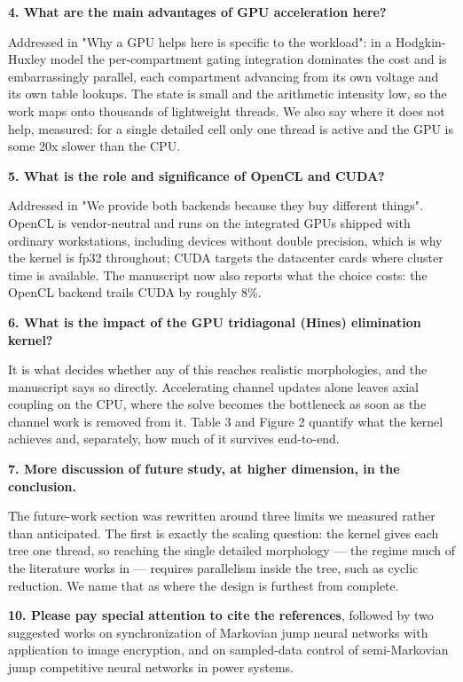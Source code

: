 \documentclass[11pt,a4paper]{article}
\begin{document}
\textbf{4. What are the main advantages of GPU acceleration here?}

Addressed in "Why a GPU helps here is specific to the workload": in a Hodgkin-Huxley model the per-compartment gating integration dominates the cost and is embarrassingly parallel, each compartment advancing from its own voltage and its own table lookups. The state is small and the arithmetic intensity low, so the work maps onto thousands of lightweight threads. We also say where it does not help, measured: for a single detailed cell only one thread is active and the GPU is some 20x slower than the CPU.

\textbf{5. What is the role and significance of OpenCL and CUDA?}

Addressed in "We provide both backends because they buy different things". OpenCL is vendor-neutral and runs on the integrated GPUs shipped with ordinary workstations, including devices without double precision, which is why the kernel is fp32 throughout; CUDA targets the datacenter cards where cluster time is available. The manuscript now also reports what the choice costs: the OpenCL backend trails CUDA by roughly 8\%.

\textbf{6. What is the impact of the GPU tridiagonal (Hines) elimination kernel?}

It is what decides whether any of this reaches realistic morphologies, and the manuscript says so directly. Accelerating channel updates alone leaves axial coupling on the CPU, where the solve becomes the bottleneck as soon as the channel work is removed from it. Table 3 and Figure 2 quantify what the kernel achieves and, separately, how much of it survives end-to-end.

\textbf{7. More discussion of future study, at higher dimension, in the conclusion.}

The future-work section was rewritten around three limits we measured rather than anticipated. The first is exactly the scaling question: the kernel gives each tree one thread, so reaching the single detailed morphology --- the regime much of the literature works in --- requires parallelism inside the tree, such as cyclic reduction. We name that as where the design is furthest from complete.

\textbf{10. Please pay special attention to cite the references}, followed by two suggested works on synchronization of Markovian jump neural networks with application to image encryption, and on sampled-data control of semi-Markovian jump competitive neural networks in power systems.
\end{document}
